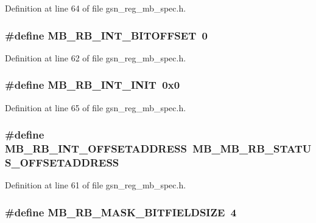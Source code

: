 Definition at line 64 of file gsn\_\-reg\_\-mb\_\-spec.h.

\hypertarget{a00562_a8cda520fdf27d64c2d05e48bda836f13}{
\subsubsection[{MB\_\-RB\_\-INT\_\-BITOFFSET}]{\setlength{\rightskip}{0pt plus 5cm}\#define MB\_\-RB\_\-INT\_\-BITOFFSET~0}}
\label{a00562_a8cda520fdf27d64c2d05e48bda836f13}


Definition at line 62 of file gsn\_\-reg\_\-mb\_\-spec.h.

\hypertarget{a00562_ac941645f19586ff157b674af71de443f}{
\subsubsection[{MB\_\-RB\_\-INT\_\-INIT}]{\setlength{\rightskip}{0pt plus 5cm}\#define MB\_\-RB\_\-INT\_\-INIT~0x0}}
\label{a00562_ac941645f19586ff157b674af71de443f}


Definition at line 65 of file gsn\_\-reg\_\-mb\_\-spec.h.

\hypertarget{a00562_a5d5a6e6093f1918d4912dab9e59587ce}{
\subsubsection[{MB\_\-RB\_\-INT\_\-OFFSETADDRESS}]{\setlength{\rightskip}{0pt plus 5cm}\#define MB\_\-RB\_\-INT\_\-OFFSETADDRESS~MB\_\-MB\_\-RB\_\-STATUS\_\-OFFSETADDRESS}}
\label{a00562_a5d5a6e6093f1918d4912dab9e59587ce}


Definition at line 61 of file gsn\_\-reg\_\-mb\_\-spec.h.

\hypertarget{a00562_a37c8bea70172d8bcebc6e6a8fe2fee27}{
\subsubsection[{MB\_\-RB\_\-MASK\_\-BITFIELDSIZE}]{\setlength{\rightskip}{0pt plus 5cm}\#define MB\_\-RB\_\-MASK\_\-BITFIELDSIZE~4}}
\label{a00562_a37c8bea70172d8bcebc6e6a8fe2fee27}


